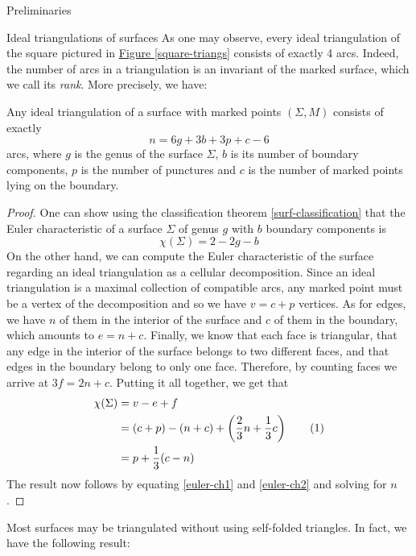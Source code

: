 \begin{chapter}{Preliminaries}
\begin{section}{Ideal triangulations of surfaces}
As one may observe, every ideal triangulation of the square pictured in \hyperref[square-triangs]{Figure \ref*{square-triangs}} consists of exactly 4 arcs. Indeed, the number of arcs in a triangulation is an invariant of the marked surface, which we call its \emph{rank}. More precisely, we have:

\begin{prop} Any ideal triangulation of a surface with marked points $(\Sigma, M)$ consists of exactly
\[
n=6g+3b+3p+c-6
\]
arcs, where $g$ is the genus of the surface $\Sigma$, $b$ is its number of boundary components, $p$ is the number of punctures and $c$ is the number of marked points lying on the boundary.
\end{prop}
\begin{proof} One can show using the classification theorem \ref{surf-classification} that the Euler characteristic of a surface $\Sigma$ of genus $g$ with $b$ boundary components is
\begin{equation}\label{euler-ch1}
\chi(\Sigma)=2-2g-b
\end{equation}
On the other hand, we can compute the Euler characteristic of the surface regarding an ideal triangulation as a cellular decomposition. Since an ideal triangulation is a maximal collection of compatible arcs, any marked point must be a vertex of the decomposition and so we have $v = c + p$ vertices. As for edges, we have $n$ of them in the interior of the surface and $c$ of them in the boundary, which amounts to $e = n + c$. Finally, we know that each face is triangular, that any edge in the interior of the surface belongs to two different faces, and that edges in the boundary belong to only one face. Therefore, by counting faces we arrive at $3f = 2n+c$. Putting it all together, we get that
\begin{align*}\label{euler-ch2}
\chi(\Sigma)&=v-e+f\\
&=(c+p)-(n+c)+\left(\frac{2}{3}n+\frac{1}{3} c\right)\addtocounter{equation}{1}\tag{\theequation}\\
&=p+\frac{1}{3}(c-n)
\end{align*}
The result now follows by equating \eqref{euler-ch1} and \eqref{euler-ch2} and solving for $n$.
\end{proof}

Most surfaces may be triangulated without using self-folded triangles. In fact, we have the following result:


\end{section}
\end{chapter}
